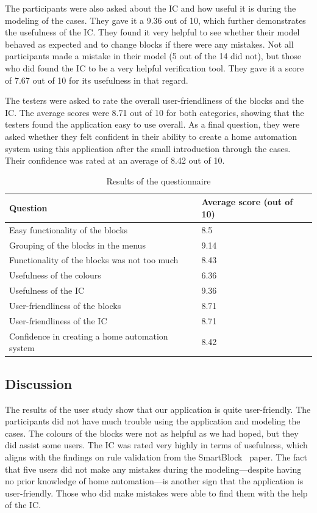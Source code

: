 \documentclass[11pt,a4paper]{report}
\begin{document}
\begin{idplisting}
The participants were also asked about the IC and how useful it is during the modeling of the cases. They gave it a 9.36 out of 10, which further demonstrates the usefulness of the IC. They found it very helpful to see whether their model behaved as expected and to change blocks if there were any mistakes. Not all participants made a mistake in their model (5 out of the 14 did not), but those who did found the IC to be a very helpful verification tool. They gave it a score of 7.67 out of 10 for its usefulness in that regard.

The testers were asked to rate the overall user-friendliness of the blocks and the IC. The average scores were 8.71 out of 10 for both categories, showing that the testers found the application easy to use overall. As a final question, they were asked whether they felt confident in their ability to create a home automation system using this application after the small introduction through the cases. Their confidence was rated at an average of 8.42 out of 10.

\begin{table}
    \centering
    \begin{tabular}{|l|l|}
        \hline
        Question & Average score (out of 10)\\
        \hline
        Easy functionality of the blocks & 8.5 \\
        Grouping of the blocks in the menus & 9.14 \\
        Functionality of the blocks was not too much & 8.43 \\
        Usefulness of the colours & 6.36 \\
        Usefulness of the IC & 9.36 \\
        User-friendliness of the blocks & 8.71 \\
        User-friendliness of the IC & 8.71 \\
        Confidence in creating a home automation system & 8.42 \\
        \hline
    \end{tabular}
    \caption{Results of the questionnaire}
    \label{tab:questionnaire_results}
\end{table}

\subsection{Discussion}
The results of the user study show that our application is quite user-friendly. The participants did not have much trouble using the application and modeling the cases. The colours of the blocks were not as helpful as we had hoped, but they did assist some users. The IC was rated very highly in terms of usefulness, which aligns with the findings on rule validation from the SmartBlock~\cite{SOTA_SmartBlock} paper. The fact that five users did not make any mistakes during the modeling—despite having no prior knowledge of home automation—is another sign that the application is user-friendly. Those who did make mistakes were able to find them with the help of the IC.


\end{idplisting}
\end{document}
